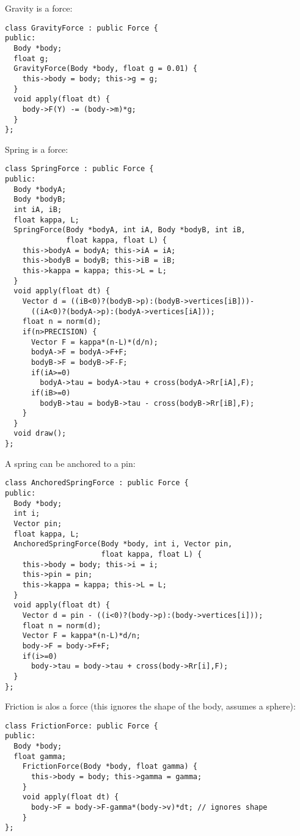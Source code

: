 \noindent
Gravity is a force: \begin{lstlisting}
class GravityForce : public Force {
public:
  Body *body;
  float g;
  GravityForce(Body *body, float g = 0.01) {
    this->body = body; this->g = g;
  }
  void apply(float dt) {
    body->F(Y) -= (body->m)*g;
  }
};
\end{lstlisting}
\noindent
Spring is a force: \begin{lstlisting}
class SpringForce : public Force {
public:
  Body *bodyA;
  Body *bodyB;
  int iA, iB;
  float kappa, L;
  SpringForce(Body *bodyA, int iA, Body *bodyB, int iB,
              float kappa, float L) {
    this->bodyA = bodyA; this->iA = iA;
    this->bodyB = bodyB; this->iB = iB;
    this->kappa = kappa; this->L = L;
  }
  void apply(float dt) {
    Vector d = ((iB<0)?(bodyB->p):(bodyB->vertices[iB]))-
      ((iA<0)?(bodyA->p):(bodyA->vertices[iA]));
    float n = norm(d);
    if(n>PRECISION) {
      Vector F = kappa*(n-L)*(d/n);
      bodyA->F = bodyA->F+F;
      bodyB->F = bodyB->F-F;
      if(iA>=0)
        bodyA->tau = bodyA->tau + cross(bodyA->Rr[iA],F);
      if(iB>=0)
        bodyB->tau = bodyB->tau - cross(bodyB->Rr[iB],F);
    }
  }
  void draw();
};
\end{lstlisting}
\noindent
A spring can be anchored to a pin: \begin{lstlisting}
class AnchoredSpringForce : public Force {
public:
  Body *body;
  int i;
  Vector pin;
  float kappa, L;
  AnchoredSpringForce(Body *body, int i, Vector pin,
                      float kappa, float L) {
    this->body = body; this->i = i;
    this->pin = pin;
    this->kappa = kappa; this->L = L;
  }
  void apply(float dt) {
    Vector d = pin - ((i<0)?(body->p):(body->vertices[i]));
    float n = norm(d);
    Vector F = kappa*(n-L)*d/n;
    body->F = body->F+F;
    if(i>=0)
      body->tau = body->tau + cross(body->Rr[i],F);
  }
};
\end{lstlisting}
\noindent
Friction is alos a force
(this ignores the shape of the body, assumes a sphere): \begin{lstlisting}
class FrictionForce: public Force {
public:
  Body *body;
  float gamma;
    FrictionForce(Body *body, float gamma) {
      this->body = body; this->gamma = gamma;
    }
    void apply(float dt) {
      body->F = body->F-gamma*(body->v)*dt; // ignores shape
    }
};
\end{lstlisting}
\noindent
